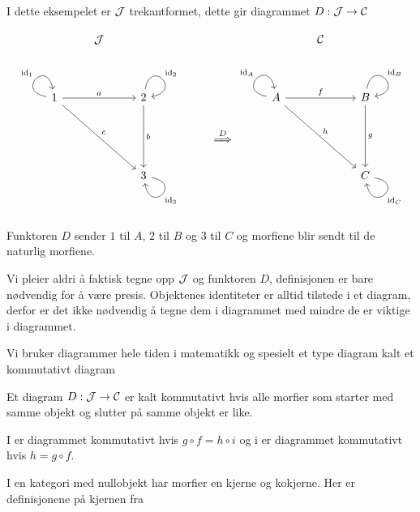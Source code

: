 \begin{eksempel}\label{ex:Diag2}
  I dette eksempelet er $\mathcal{J}$ trekantformet, dette gir
  diagrammet $D:\mathcal{J}\to\mathcal{C}$

  \[\begin{tikzcd}
	& \Jcal &&&&& \Ccal \\
	\\
	1 && 2 &&& A && B \\
	&&&& {\stackrel{D}{\implies}} \\
	&& 3 &&&&& C
	\arrow["{\id_1}", from=3-1, to=3-1, loop, in=100, out=170, distance=10mm]
	\arrow["a", from=3-1, to=3-3]
	\arrow["c", from=3-1, to=5-3]
	\arrow["{\id_2}", from=3-3, to=3-3, loop, in=10, out=80, distance=10mm]
	\arrow["b", from=3-3, to=5-3]
	\arrow["{\id_A}", from=3-6, to=3-6, loop, in=100, out=170, distance=10mm]
	\arrow["f", from=3-6, to=3-8]
	\arrow["h", from=3-6, to=5-8]
	\arrow["{\id_B}", from=3-8, to=3-8, loop, in=10, out=80, distance=10mm]
	\arrow["g", from=3-8, to=5-8]
	\arrow["{\id_3}", from=5-3, to=5-3, loop, in=280, out=350, distance=10mm]
	\arrow["{\id_C}", from=5-8, to=5-8, loop, in=280, out=350, distance=10mm]
\end{tikzcd}\]

Funktoren $D$ sender $1$ til $A$, $2$ til $B$ og $3$ til $C$ og
  morfiene blir sendt til de naturlig morfiene.
\end{eksempel}
Vi pleier aldri å faktisk tegne opp $\mathcal{J}$ og funktoren $D$,
definisjonen er bare nødvendig for å være presis. Objektenes
identiteter er alltid tilstede i et diagram, derfor er det ikke nødvendig
å tegne dem i diagrammet med mindre de er viktige i diagrammet.

Vi bruker diagrammer hele tiden i matematikk og spesielt et type
diagram kalt et kommutativt diagram

\begin{definisjon}\label{def:KomDiag}
Et diagram $D:\mathcal{J}\to\mathcal{C}$ er kalt kommutativt hvis alle morfier
som starter med samme objekt og slutter på samme objekt er like.
\end{definisjon}

I  er diagrammet kommutativt hvis $g\circ
f = h\circ i$ og i  er diagrammet
kommutativt hvis $h=g\circ f$.


I en kategori med nullobjekt har morfier en kjerne og kokjerne.
Her er definisjonene på kjernen fra \cite{Lane2010-mf}

